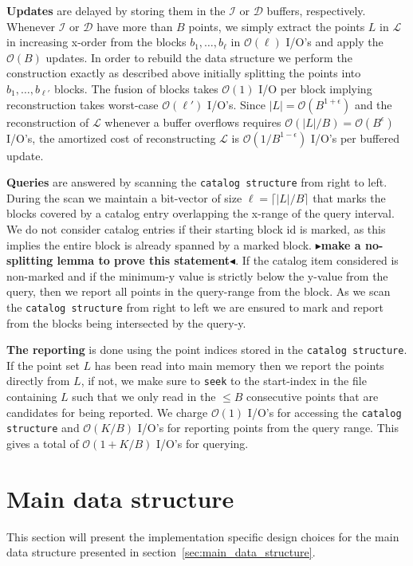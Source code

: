 \documentclass[twoside,11pt,openright]{report}
\newcommand{\todo}[1]{{\color[rgb]{.5,0,0}\textbf{$\blacktriangleright$#1$\blacktriangleleft$}}}
\begin{document}
\textbf{Updates} are delayed by storing them in the $\mathcal{I}$ or $\mathcal{D}$ buffers, respectively. Whenever $\mathcal{I}$ or $\mathcal{D}$ have more than $B$ points, we simply extract the points $L$ in $\mathcal{L}$ in increasing x-order from the blocks $b_1, \dots, b_{\ell}$ in $\mathcal{O}(\ell)$ I/O's and apply the $\mathcal{O}(B)$ updates. In order to rebuild the data structure we perform the construction exactly as described above initially splitting the points into $b_1, \dots, b_{\ell'}$ blocks. The fusion of blocks takes $\mathcal{O}(1)$ I/O per block implying reconstruction takes worst-case $\mathcal{O}(\ell')$ I/O's. Since $\lvert L \lvert = \mathcal{O}(B^{1+\epsilon})$ and the reconstruction of $\mathcal{L}$ whenever a buffer overflows requires $\mathcal{O}(\lvert L \lvert / B) = \mathcal{O}(B^{\epsilon})$ I/O's, the amortized cost of reconstructing $\mathcal{L}$ is $\mathcal{O}(1/B^{1-\epsilon})$ I/O's per buffered update.

\textbf{Queries} are answered by scanning the \texttt{catalog structure} from right to left. During the scan we maintain a bit-vector of size $\ell = \lceil\lvert L \lvert / B\rceil$ that marks the blocks covered by a catalog entry overlapping the x-range of the query interval. We do not consider catalog entries if their starting block id is marked, as this implies the entire block is already spanned by a marked block. \todo{make a no-splitting lemma to prove this statement}.
If the catalog item considered is non-marked and if the minimum-y value is strictly below the y-value from the query, then we report all points in the query-range from the block. As we scan the \texttt{catalog structure} from right to left we are ensured to mark and report from the blocks being intersected by the query-y.

\textbf{The reporting} is done using the point indices stored in the \texttt{catalog structure}. If the point set $L$ has been read into main memory then we report the points directly from $L$, if not, we make sure to \texttt{seek} to the start-index in the file containing $L$ such that we only read in the $\leq B$ consecutive points that are candidates for being reported.
We charge $\mathcal{O}(1)$ I/O's for accessing the \texttt{catalog structure} and $\mathcal{O}(K/B)$ I/O's for reporting points from the query range. This gives a total of  $\mathcal{O}(1+K/B)$ I/O's for querying.

\section{Main data structure}
\label{sec:impl_main_data_structure}
This section will present the implementation specific design choices for the main data structure presented in section~\ref{sec:main_data_structure}. \\
\end{document}
